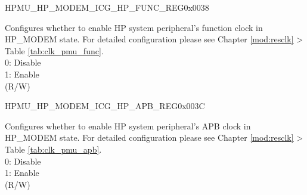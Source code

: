 \begin{register}{H}{PMU\_HP\_MODEM\_ICG\_HP\_FUNC\_REG}{0x0038}\label{regdesc:PMUHPMODEMICGHPFUNCREG}
%
\regnewline%
\begin{regdesc}\begin{reglist}
\label{fielddesc:PMUHPMODEMDIGICGFUNCEN}\item [PMU\_HP\_MODEM\_DIG\_ICG\_FUNC\_EN] Configures whether to enable HP system peripheral's function clock in HP\_MODEM state. For detailed configuration please see Chapter \ref{mod:resclk} \textit{} > Table \ref{tab:clk_pmu_func}.\\
0: Disable\\
1: Enable\\
(R/W)
\end{reglist}\end{regdesc}
\end{register}


\begin{register}{H}{PMU\_HP\_MODEM\_ICG\_HP\_APB\_REG}{0x003C}\label{regdesc:PMUHPMODEMICGHPAPBREG}
%
\regnewline%
\begin{regdesc}\begin{reglist}
\label{fielddesc:PMUHPMODEMDIGICGAPBEN}\item [PMU\_HP\_MODEM\_DIG\_ICG\_APB\_EN] Configures whether to enable HP system peripheral's APB clock in HP\_MODEM state. For detailed configuration please see Chapter \ref{mod:resclk} \textit{} > Table \ref{tab:clk_pmu_apb}. \\
0: Disable\\
1: Enable\\
(R/W)
\end{reglist}\end{regdesc}
\end{register}


